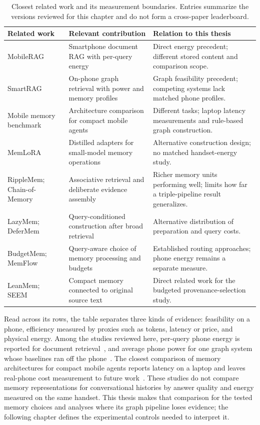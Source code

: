 \begin{table}[htbp]
  \centering
  \small
  \begin{tabular}{p{}p{}p{}}
    \toprule
    Related work & Relevant contribution & Relation to this thesis \\
    \midrule
    MobileRAG~\citep{mobilerag_energy} & Smartphone document RAG with per-query energy &
    Direct energy precedent; different stored content and comparison scope. \\
    SmartRAG~\citep{smartrag} & On-phone graph retrieval with power and memory profiles &
    Graph feasibility precedent; competing systems lack matched phone profiles. \\
    Mobile memory benchmark~\citep{mobile_memory_architectures} & Architecture comparison
    for compact mobile agents & Different tasks; laptop latency measurements and
    rule-based graph construction. \\
    MemLoRA~\citep{memlora} & Distilled adapters for small-model memory operations &
    Alternative construction design; no matched handset-energy study. \\
    RippleMem; Chain-of-Memory~\citep{ripplemem,chain_of_memory} & Associative retrieval
    and deliberate evidence assembly & Richer memory units performing well; limits how far a
    triple-pipeline result generalizes. \\
    LazyMem; DeferMem~\citep{lazymem,defermem} & Query-conditioned construction after broad
    retrieval & Alternative distribution of preparation and query costs. \\
    BudgetMem; MemFlow~\citep{budgetmem,memflow} & Query-aware choice of memory processing
    and budgets & Established routing approaches; phone energy remains a separate measure. \\
    LeanMem; SEEM~\citep{leanmem,seem} & Compact memory connected to original source text &
    Direct related work for the budgeted provenance-selection study. \\
    \bottomrule
  \end{tabular}
  \caption{Closest related work and its measurement boundaries. Entries summarize
  the versions reviewed for this chapter and do not form a cross-paper leaderboard.}
  \label{tab:ch2_related_position}
\end{table}

Read across its rows, the table separates three kinds of evidence: feasibility on a phone,
efficiency measured by proxies such as tokens, latency or price, and physical energy. Among the
studies reviewed here, per-query phone energy is reported for document
retrieval~\citep{mobilerag_energy}, and average phone power for one graph system whose baselines
ran off the phone~\citep{smartrag}. The closest comparison of memory architectures for compact
mobile agents reports latency on a laptop and leaves real-phone cost measurement to future
work~\citep{mobile_memory_architectures}. These studies do not compare memory representations for
conversational histories by answer quality and energy measured on the same handset. This thesis
makes that comparison for the tested memory choices and analyses where its graph pipeline loses
evidence; the following chapter defines the experimental controls needed to interpret it.

